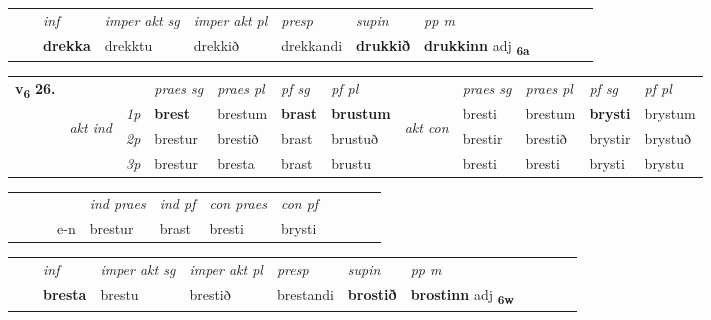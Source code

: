 \begin{tabular}{llllllllllll}
 & & \textit{inf} & \textit{imper akt sg} & \textit{imper akt pl}   & \textit{presp} & \textit{supin}  & \textit{pp m}     \\*
  & & \textbf{drekka} & drekktu  & drekkið   & drekkandi &  \textbf{drukkið}  & \textbf{drukkinn} adj \textbf{\textsubscript{6a}} \\*
\cmidrule{1-12}
\end{tabular}



\begin{tabular}{llllllllllll} \toprule
\multirow{4}{*}{{{\textbf{v{\textsubscript{6}}} \Large{\textbf{26.}}}}}  & &   &  \textit{praes sg}  & \textit{praes pl}  &\textit{ pf sg} & \textit{pf pl} &  &  \textit{praes sg}  & \textit{praes pl}  & \textit{pf sg} & \textit{pf pl } \\*
	\cmidrule{4-7} \cmidrule{9-12}
 & \multirow{3}{*}{\begin{turn}{90}\textit{akt ind}\end{turn}} & {\textit{1p}} & \textbf{brest} & brestum    & \textbf{brast} & \textbf{brustum} & \multirow{3}{*}{\begin{turn}{90}\textit{akt con}\end{turn}} &bresti & brestum & \textbf{brysti} & brystum\\*
& &  {\textit{2p}} &  brestur  & brestið   & brast & brustuð & & brestir & brestið & brystir & brystuð \\*
& &  {\textit{3p}} & brestur & bresta   & brast & brustu & & bresti & bresti& brysti & brystu  \\*
\cmidrule{4-7} \cmidrule{9-12}
\end{tabular}


\begin{tabular}{llllllllllll}
 & &  & &  \textit{ind praes} & \textit{ind pf} & \textit{con praes} & \textit{con pf} \\*
&  & & e-n & brestur & brast & bresti & brysti \\*
\cmidrule{5-9}
\end{tabular}


\begin{tabular}{llllllllllll}
 & & \textit{inf} & \textit{imper akt sg} & \textit{imper akt pl}   & \textit{presp} & \textit{supin}  & \textit{pp m}     \\*
  & & \textbf{bresta} & brestu  & brestið   & brestandi &  \textbf{brostið}  & \textbf{brostinn} adj \textbf{\textsubscript{6w}} \\*
\cmidrule{1-12}
\end{tabular}



